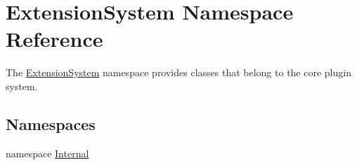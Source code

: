 \hypertarget{namespace_extension_system}{\section{\-Extension\-System \-Namespace \-Reference}
\label{namespace_extension_system}
}


\-The \hyperlink{namespace_extension_system}{\-Extension\-System} namespace provides classes that belong to the core plugin system.  


\subsection*{\-Namespaces}
\begin{DoxyCompactItemize}
\item 
namespace \hyperlink{namespace_extension_system_1_1_internal}{\-Internal}
\end{DoxyCompactItemize}

